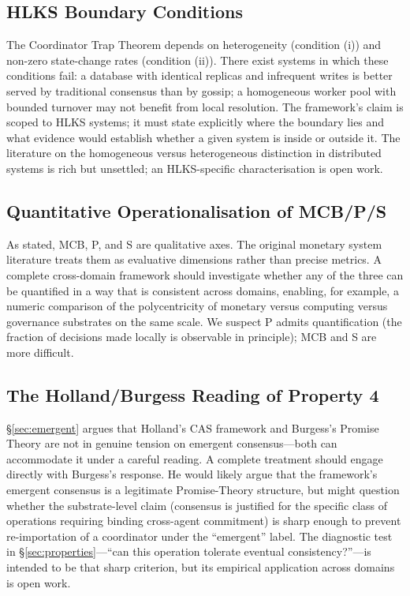 \documentclass[11pt]{article}
\theoremstyle{definition}
\theoremstyle{plain}
\theoremstyle{plain}
\begin{document}
\subsection{HLKS Boundary Conditions}

The Coordinator Trap Theorem depends on heterogeneity (condition (i)) and
non-zero state-change rates (condition (ii)). There exist systems in which
these conditions fail: a database with identical replicas and infrequent
writes is better served by traditional consensus than by gossip; a
homogeneous worker pool with bounded turnover may not benefit from local
resolution. The framework's claim is scoped to HLKS systems; it must state
explicitly where the boundary lies and what evidence would establish whether
a given system is inside or outside it. The literature on the homogeneous
versus heterogeneous distinction in distributed systems is rich but
unsettled; an HLKS-specific characterisation is open work.

\subsection{Quantitative Operationalisation of MCB/P/S}

As stated, MCB, P, and S are qualitative axes. The original monetary system
literature treats them as evaluative dimensions rather than precise metrics.
A complete cross-domain framework should investigate whether any of the three
can be quantified in a way that is consistent across domains, enabling, for
example, a numeric comparison of the polycentricity of monetary versus
computing versus governance substrates on the same scale. We suspect P admits
quantification (the fraction of decisions made locally is observable in
principle); MCB and S are more difficult.

\subsection{The Holland/Burgess Reading of Property 4}

\S\ref{sec:emergent} argues that Holland's CAS framework and Burgess's
Promise Theory are not in genuine tension on emergent consensus---both can
accommodate it under a careful reading. A complete treatment should engage
directly with Burgess's response. He would likely argue that the framework's
emergent consensus is a legitimate Promise-Theory structure, but might
question whether the substrate-level claim (consensus is justified for the
specific class of operations requiring binding cross-agent commitment) is
sharp enough to prevent re-importation of a coordinator under the
``emergent'' label. The diagnostic test in \S\ref{sec:properties}---``can
this operation tolerate eventual consistency?''---is intended to be that
sharp criterion, but its empirical application across domains is open work.
\end{document}
